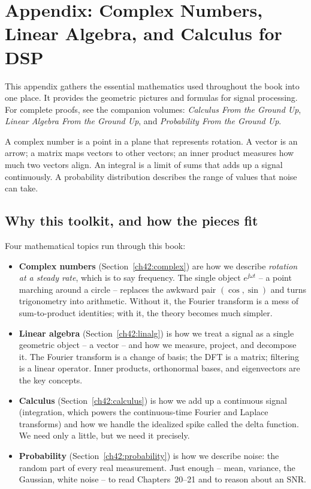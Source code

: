 \chapter{Appendix: Complex Numbers, Linear Algebra, and Calculus for DSP}

This appendix gathers the essential mathematics used throughout the book into one place. It provides the geometric pictures and formulas for signal processing. For complete proofs, see the companion volumes: \emph{Calculus From the Ground Up}, \emph{Linear Algebra From the Ground Up}, and \emph{Probability From the Ground Up}.

A complex number is a point in a plane that represents rotation. A vector is an arrow; a matrix maps vectors to other vectors; an inner product measures how much two vectors align. An integral is a limit of sums that adds up a signal continuously. A probability distribution describes the range of values that noise can take.

\section{Why this toolkit, and how the pieces fit}
\label{ch42:overview}

Four mathematical topics run through this book:

\begin{itemize}
  \item \textbf{Complex numbers} (Section~\ref{ch42:complex}) are how we describe \emph{rotation
  at a steady rate}, which is to say frequency. The single object $e^{\jj\omega t}$ -- a point
  marching around a circle -- replaces the awkward pair $(\cos,\sin)$ and turns trigonometry into
  arithmetic. Without it, the Fourier transform is a mess of sum-to-product identities; with it,
  the theory becomes much simpler.
  \item \textbf{Linear algebra} (Section~\ref{ch42:linalg}) is how we treat a signal as a single
  geometric object -- a vector -- and how we measure, project, and decompose it. The Fourier
  transform is a change of basis; the DFT is a matrix; filtering is a linear operator. Inner
  products, orthonormal bases, and eigenvectors are the key concepts.
  \item \textbf{Calculus} (Section~\ref{ch42:calculus}) is how we add up a continuous signal
  (integration, which powers the continuous-time Fourier and Laplace transforms) and how we
  handle the idealized spike called the delta function. We need only a little, but we need it
  precisely.
  \item \textbf{Probability} (Section~\ref{ch42:probability}) is how we describe noise: the
  random part of every real measurement. Just enough -- mean, variance, the Gaussian, white
  noise -- to read Chapters~20--21 and to reason about an SNR.
\end{itemize}

